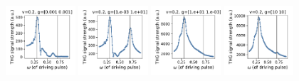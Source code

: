 \documentclass[a4paper]{article}
\begin{document}
\begin{figure}[H]
  \centering
  \includegraphics[width=0.23\textwidth]{driving-v2-case0.pdf}
  \includegraphics[width=0.23\textwidth]{driving-v2-case1.pdf}
  \includegraphics[width=0.23\textwidth]{driving-v2-case2.pdf}
  \includegraphics[width=0.23\textwidth]{driving-v2-case3.pdf}
\end{figure}
\end{document}
